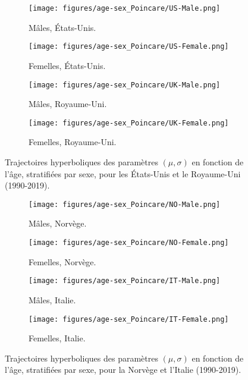 \begin{figure}[H]
	\centering
	\begin{subfigure}{0.48\textwidth}
		\centering
		\texttt{[image: figures/age-sex\_Poincare/US-Male.png]}
		\caption{Mâles, États-Unis.}
		\label{fig:age-sex_Poincare_US_male}
	\end{subfigure}
	\hfill
	\begin{subfigure}{0.48\textwidth}
		\centering
		\texttt{[image: figures/age-sex\_Poincare/US-Female.png]}
		\caption{Femelles, États-Unis.}
		\label{fig:age-sex_Poincare_US_female}
	\end{subfigure}
	
	\vspace{1em}
	
	\begin{subfigure}{0.48\textwidth}
		\centering
		\texttt{[image: figures/age-sex\_Poincare/UK-Male.png]}
		\caption{Mâles, Royaume-Uni.}
		\label{fig:age-sex_Poincare_UK_male}
	\end{subfigure}
	\hfill
	\begin{subfigure}{0.48\textwidth}
		\centering
		\texttt{[image: figures/age-sex\_Poincare/UK-Female.png]}
		\caption{Femelles, Royaume-Uni.}
		\label{fig:age-sex_Poincare_UK_female}
	\end{subfigure}
	\caption{Trajectoires hyperboliques des paramètres \((\mu, \sigma)\) en fonction de l'âge, stratifiées par sexe, pour les États-Unis et le Royaume-Uni (1990-2019).}
	\label{fig:age-sex_Poincare_US_UK}
\end{figure}

\begin{figure}[H]
	\centering
	\begin{subfigure}{0.48\textwidth}
		\centering
		\texttt{[image: figures/age-sex\_Poincare/NO-Male.png]}
		\caption{Mâles, Norvège.}
		\label{fig:age-sex_Poincare_NO_male}
	\end{subfigure}
	\hfill
	\begin{subfigure}{0.48\textwidth}
		\centering
		\texttt{[image: figures/age-sex\_Poincare/NO-Female.png]}
		\caption{Femelles, Norvège.}
		\label{fig:age-sex_Poincare_NO_female}
	\end{subfigure}
	
	\vspace{1em}
	
	\begin{subfigure}{0.48\textwidth}
		\centering
		\texttt{[image: figures/age-sex\_Poincare/IT-Male.png]}
		\caption{Mâles, Italie.}
		\label{fig:age-sex_Poincare_IT_male}
	\end{subfigure}
	\hfill
	\begin{subfigure}{0.48\textwidth}
		\centering
		\texttt{[image: figures/age-sex\_Poincare/IT-Female.png]}
		\caption{Femelles, Italie.}
		\label{fig:age-sex_Poincare_IT_female}
	\end{subfigure}
	\caption{Trajectoires hyperboliques des paramètres \((\mu, \sigma)\) en fonction de l'âge, stratifiées par sexe, pour la Norvège et l'Italie (1990-2019).}
	\label{fig:age-sex_Poincare_NO_IT}
\end{figure}



